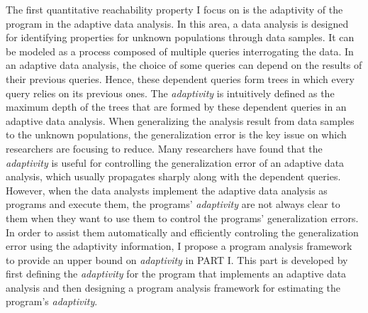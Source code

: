 The first quantitative reachability property
 I focus on is the adaptivity of the program in the adaptive data analysis.
 In this area, a data analysis is designed for identifying  properties for unknown populations 
 through data samples.
It can be modeled as a process composed of 
multiple queries interrogating the data.
 In an adaptive data analysis, the choice of some queries can depend on the results of their previous queries. 
 Hence, these dependent queries form trees in which every query relies on its previous ones.
The \emph{adaptivity} is intuitively defined as the maximum depth of the trees that are formed by these dependent queries
in an adaptive data analysis.
When generalizing the analysis result from data samples to the unknown populations, 
the generalization error is the key issue on which researchers are focusing to reduce.
 Many researchers have found that the
 \emph{adaptivity} is useful for controlling the generalization error of an adaptive data analysis,
 which usually propagates sharply along with the dependent queries. 
 However, when the data analysts implement the adaptive
 data analysis as programs and execute them,
the programs' \emph{adaptivity} are not always clear to them
when they want to use them to control the programs' generalization errors.
In order to assist them automatically and efficiently controling the generalization error using the adaptivity information,
 I propose a program analysis framework
 to provide an upper bound on \emph{adaptivity}
in PART I.
This part is developed by first defining the \emph{adaptivity} for 
 the program that implements an adaptive data analysis
 and then designing
 a program analysis framework for estimating the program's \emph{adaptivity}.

